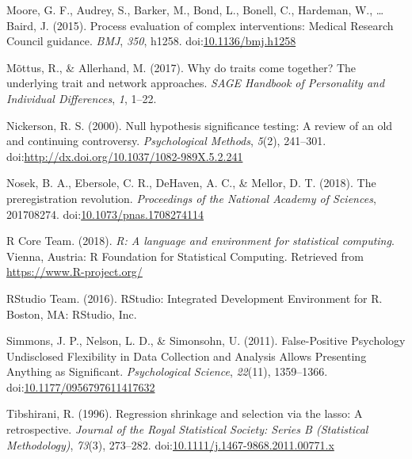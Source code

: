 \documentclass[english,floatsintext,]{apa6}
\theoremstyle{definition}
\theoremstyle{definition}
\theoremstyle{definition}
\theoremstyle{remark}
\begin{document}
\hypertarget{ref-mooreProcessEvaluationComplex2015}{}
Moore, G. F., Audrey, S., Barker, M., Bond, L., Bonell, C., Hardeman,
W., \ldots{} Baird, J. (2015). Process evaluation of complex
interventions: Medical Research Council guidance. \emph{BMJ},
\emph{350}, h1258.
doi:\href{https://doi.org/10.1136/bmj.h1258}{10.1136/bmj.h1258}

\hypertarget{ref-mottusWhyTraitsCome2017}{}
Mõttus, R., \& Allerhand, M. (2017). Why do traits come together? The
underlying trait and network approaches. \emph{SAGE Handbook of
Personality and Individual Differences}, \emph{1}, 1--22.

\hypertarget{ref-nickersonNullHypothesisSignificance2000}{}
Nickerson, R. S. (2000). Null hypothesis significance testing: A review
of an old and continuing controversy. \emph{Psychological Methods},
\emph{5}(2), 241--301.
doi:\href{https://doi.org/http://dx.doi.org/10.1037/1082-989X.5.2.241}{http://dx.doi.org/10.1037/1082-989X.5.2.241}

\hypertarget{ref-nosekPreregistrationRevolution2018}{}
Nosek, B. A., Ebersole, C. R., DeHaven, A. C., \& Mellor, D. T. (2018).
The preregistration revolution. \emph{Proceedings of the National
Academy of Sciences}, 201708274.
doi:\href{https://doi.org/10.1073/pnas.1708274114}{10.1073/pnas.1708274114}

\hypertarget{ref-R-base}{}
R Core Team. (2018). \emph{R: A language and environment for statistical
computing}. Vienna, Austria: R Foundation for Statistical Computing.
Retrieved from \url{https://www.R-project.org/}

\hypertarget{ref-rstudioteamRStudioIntegratedDevelopment2016}{}
RStudio Team. (2016). RStudio: Integrated Development Environment for R.
Boston, MA: RStudio, Inc.

\hypertarget{ref-simmonsFalsePositivePsychologyUndisclosed2011}{}
Simmons, J. P., Nelson, L. D., \& Simonsohn, U. (2011). False-Positive
Psychology Undisclosed Flexibility in Data Collection and Analysis
Allows Presenting Anything as Significant. \emph{Psychological Science},
\emph{22}(11), 1359--1366.
doi:\href{https://doi.org/10.1177/0956797611417632}{10.1177/0956797611417632}

\hypertarget{ref-tibshiraniRegressionShrinkageSelection1996}{}
Tibshirani, R. (1996). Regression shrinkage and selection via the lasso:
A retrospective. \emph{Journal of the Royal Statistical Society: Series
B (Statistical Methodology)}, \emph{73}(3), 273--282.
doi:\href{https://doi.org/10.1111/j.1467-9868.2011.00771.x}{10.1111/j.1467-9868.2011.00771.x}
\end{document}
